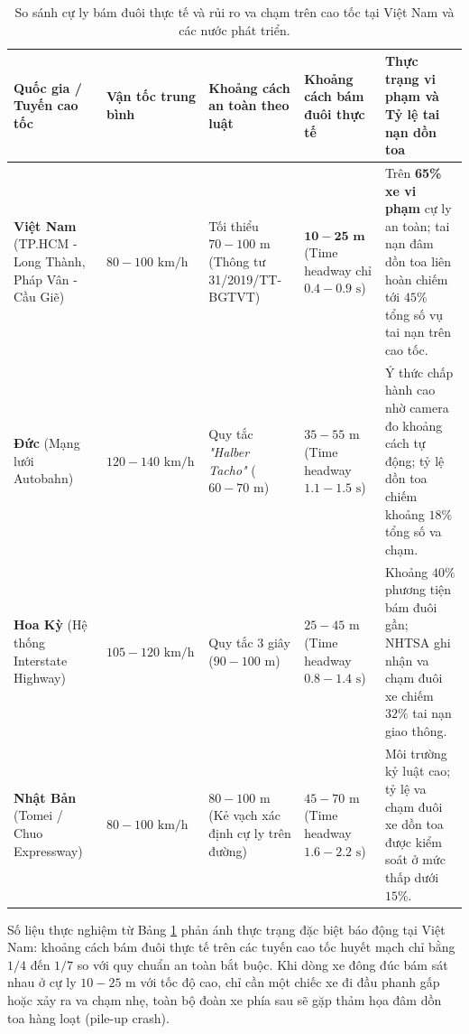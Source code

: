 \documentclass[a4paper]{article}
\begin{document}
\begin{table}[H]
    \centering
    \small
    \begin{tabularx}{\textwidth}{|>{\raggedright\arraybackslash}p{2.6cm}|>{\centering\arraybackslash}p{2.0cm}|>{\raggedright\arraybackslash}p{2.4cm}|>{\raggedright\arraybackslash}p{2.4cm}|>{\raggedright\arraybackslash}X|}
        \hline
        \textbf{Quốc gia / Tuyến cao tốc} & \textbf{Vận tốc trung bình} & \textbf{Khoảng cách an toàn theo luật} & \textbf{Khoảng cách bám đuôi thực tế} & \textbf{Thực trạng vi phạm và Tỷ lệ tai nạn dồn toa} \\
        \hline
        \textbf{Việt Nam} (TP.HCM - Long Thành, Pháp Vân - Cầu Giẽ) & $80 - 100 \text{ km/h}$ & Tối thiểu $70 - 100 \text{ m}$ (Thông tư 31/2019/TT-BGTVT) & $\mathbf{10 - 25 \text{ m}}$ (Time headway chỉ $0.4 - 0.9 \text{ s}$) & Trên \textbf{65\% xe vi phạm} cự ly an toàn; tai nạn đâm dồn toa liên hoàn chiếm tới $45\%$ tổng số vụ tai nạn trên cao tốc. \\
        \hline
        \textbf{Đức} (Mạng lưới Autobahn) & $120 - 140 \text{ km/h}$ & Quy tắc \textit{"Halber Tacho"} ($60 - 70 \text{ m}$) & $35 - 55 \text{ m}$ (Time headway $1.1 - 1.5 \text{ s}$) & Ý thức chấp hành cao nhờ camera đo khoảng cách tự động; tỷ lệ dồn toa chiếm khoảng $18\%$ tổng số va chạm. \\
        \hline
        \textbf{Hoa Kỳ} (Hệ thống Interstate Highway) & $105 - 120 \text{ km/h}$ & Quy tắc 3 giây ($90 - 100 \text{ m}$) & $25 - 45 \text{ m}$ (Time headway $0.8 - 1.4 \text{ s}$) & Khoảng $40\%$ phương tiện bám đuôi gần; NHTSA ghi nhận va chạm đuôi xe chiếm $32\%$ tai nạn giao thông. \\
        \hline
        \textbf{Nhật Bản} (Tomei / Chuo Expressway) & $80 - 100 \text{ km/h}$ & $80 - 100 \text{ m}$ (Kẻ vạch xác định cự ly trên đường) & $45 - 70 \text{ m}$ (Time headway $1.6 - 2.2 \text{ s}$) & Môi trường kỷ luật cao; tỷ lệ va chạm đuôi xe dồn toa được kiểm soát ở mức thấp dưới $15\%$. \\
        \hline
    \end{tabularx}
    \caption{So sánh cự ly bám đuôi thực tế và rủi ro va chạm trên cao tốc tại Việt Nam và các nước phát triển.}
    \label{tab:headway_comparison}
\end{table}

Số liệu thực nghiệm từ Bảng \ref{tab:headway_comparison} phản ánh thực trạng đặc biệt báo động tại Việt Nam: khoảng cách bám đuôi thực tế trên các tuyến cao tốc huyết mạch chỉ bằng $1/4$ đến $1/7$ so với quy chuẩn an toàn bắt buộc. Khi dòng xe đông đúc bám sát nhau ở cự ly $10 - 25 \text{ m}$ với tốc độ cao, chỉ cần một chiếc xe đi đầu phanh gấp hoặc xảy ra va chạm nhẹ, toàn bộ đoàn xe phía sau sẽ gặp thảm họa đâm dồn toa hàng loạt (pile-up crash).
\end{document}
